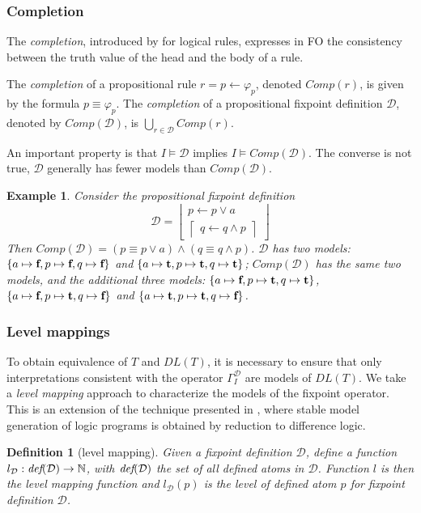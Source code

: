 \documentclass{tlp}
\newcommand{\Tr}{\mbox{\bf t}}
\newcommand{\Fa}{\mbox{\bf f}}
\newcommand{\rul}{\leftarrow}
\newcommand{\dlt}{DL(T)}
\newcommand{\lfd}[1]{\ensuremath{\left \lfloor \begin{array}{l}#1\end{array} \right \rfloor }}
\newcommand{\gfd}[1]{\ensuremath{\left \lceil \begin{array}{l}#1\end{array} \right \rceil}}
\newcommand{\FD}{\ensuremath{\mathcal{D}}\xspace}
\newcommand{\defp}[1]{\ensuremath{\mbox{\it def}(#1)}\xspace}
\newcommand{\Op}[2]{\ensuremath{\Gamma_{#1}^{#2}}}
\newtheorem{example}[lemma]{Example}
\newtheorem{definition}[lemma]{Definition}
\begin{document}
\subsubsection{Completion}
The \emph{completion}, introduced by \cite{adbt/Clark78} for logical rules, expresses in FO the consistency between the truth value of the head and the body of a rule.

The {\em completion} of a propositional rule $r = p \rul \varphi_p$, denoted $Comp(r)$, is given by the formula $p \equiv \varphi_p$. The {\em completion} of a propositional fixpoint definition $\FD$, denoted by $Comp(\FD)$, is $\bigcup_{r \in \FD} Comp(r)$.

An important property is that $I \models \FD$ implies $I \models Comp(\FD)$. The converse is not true, $\FD$ generally has fewer models than $Comp(\FD)$.

\begin{example}\label{ex:completionvsmodel}
Consider the propositional fixpoint definition 
$$\FD = \lfd{ p \rul p \lor a \\
           \gfd{ q \rul q \land p}}$$
Then $Comp(\FD) = (p \equiv p \lor a) \land (q \equiv q \land p)$.
$\FD$ has two models: $\{ a \mapsto \Fa, p \mapsto \Fa, q \mapsto
\Fa \}$ and $\{ a \mapsto \Tr, p \mapsto \Tr, q \mapsto \Tr \}$;
$Comp(\FD)$ has the same two models, and the additional three
models: $\{ a \mapsto \Fa, p \mapsto \Tr, q \mapsto \Tr\}$, $\{ a
\mapsto \Fa, p \mapsto \Tr, q \mapsto \Fa\}$ and $\{ a \mapsto \Tr,
p \mapsto \Tr, q \mapsto \Fa \}$.
\end{example}

\subsubsection{Level mappings}
To obtain equivalence of $T$ and $\dlt$, it is necessary to ensure that only interpretations consistent with the operator $\Op{I}{\FD}$ are models of $\dlt$. We take a \emph{level mapping} approach to characterize the models of the fixpoint operator. This is an extension of the technique presented in \cite{lpnmr/JanhunenNS09,amai/Niemela08}, where stable model generation of logic programs is obtained by reduction to difference logic.

\begin{definition}[level mapping]
Given a fixpoint definition $\FD$, define a function $l_{\FD}: \defp{\FD} \rightarrow \mathbb{N}$, with $\defp{\FD}$ the set of all defined atoms in $\FD$. Function $l$ is then the \emph{level mapping} function and $l_{\FD}(p)$ is the \emph{level} of defined atom $p$ for fixpoint definition $\FD$.
\end{definition}
\end{document}
